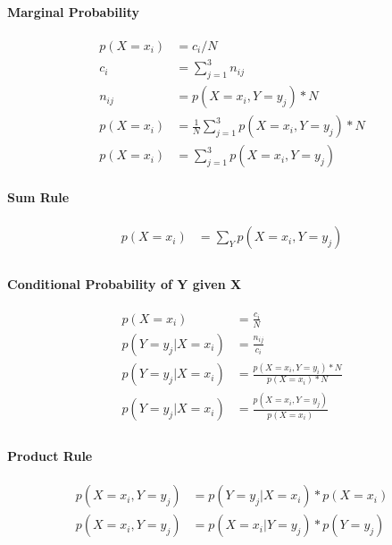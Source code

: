 \documentclass{article}
\begin{document}
\paragraph{Marginal Probability}
\begin{align*}
    p(X = x_i) & = c_i/N                                              \\
    c_i        & = \sum_{j=1}^{3} n_{ij}                              \\
    n_{ij}     & = p(X = x_i, Y = y_j)*N                              \\
    p(X = x_i) & = \frac{1}{N} \sum_{j=1}^{3} p(X = x_i, Y = y_j) * N \\
    p(X = x_i) & = \sum_{j=1}^{3} p(X = x_i, Y = y_j)
\end{align*}

\paragraph{Sum Rule}
\begin{align*}
    p(X = x_i) & = \sum_{Y} p(X = x_i, Y = y_j) \\
\end{align*}

\paragraph{Conditional Probability of Y given X}
\begin{align*}
    p(X = x_i)           & = \frac{c_i}{N}                                  \\
    p(Y = y_j | X = x_i) & = \frac{n_{ij}}{c_i}                             \\
    p(Y = y_j | X = x_i) & = \frac{p(X = x_i, Y = y_i) * N}{p(X = x_i) * N} \\
    p(Y = y_j | X = x_i) & = \frac{p(X = x_i, Y = y_j)}{p(X = x_i)}         \\
\end{align*}
\paragraph{Product Rule}
\begin{align*}
    p(X = x_i, Y = y_j) & = p(Y = y_j | X = x_i) * p(X = x_i) \\
    p(X = x_i, Y = y_j) & = p(X = x_i | Y = y_j) * p(Y = y_j) \\
\end{align*}
\end{document}
